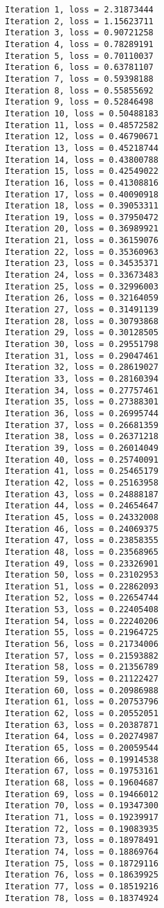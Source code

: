\documentclass[11pt]{article}
\begin{document}
    \begin{Verbatim}[commandchars=\\\{\}]
Iteration 1, loss = 2.31873444
Iteration 2, loss = 1.15623711
Iteration 3, loss = 0.90721258
Iteration 4, loss = 0.78289191
Iteration 5, loss = 0.70110037
Iteration 6, loss = 0.63781107
Iteration 7, loss = 0.59398188
Iteration 8, loss = 0.55855692
Iteration 9, loss = 0.52846498
Iteration 10, loss = 0.50488183
Iteration 11, loss = 0.48572582
Iteration 12, loss = 0.46790671
Iteration 13, loss = 0.45218744
Iteration 14, loss = 0.43800788
Iteration 15, loss = 0.42549022
Iteration 16, loss = 0.41308816
Iteration 17, loss = 0.40090918
Iteration 18, loss = 0.39053311
Iteration 19, loss = 0.37950472
Iteration 20, loss = 0.36989921
Iteration 21, loss = 0.36159076
Iteration 22, loss = 0.35360963
Iteration 23, loss = 0.34535371
Iteration 24, loss = 0.33673483
Iteration 25, loss = 0.32996003
Iteration 26, loss = 0.32164059
Iteration 27, loss = 0.31491139
Iteration 28, loss = 0.30793868
Iteration 29, loss = 0.30128505
Iteration 30, loss = 0.29551798
Iteration 31, loss = 0.29047461
Iteration 32, loss = 0.28619027
Iteration 33, loss = 0.28160394
Iteration 34, loss = 0.27757461
Iteration 35, loss = 0.27388301
Iteration 36, loss = 0.26995744
Iteration 37, loss = 0.26681359
Iteration 38, loss = 0.26371218
Iteration 39, loss = 0.26014049
Iteration 40, loss = 0.25740091
Iteration 41, loss = 0.25465179
Iteration 42, loss = 0.25163958
Iteration 43, loss = 0.24888187
Iteration 44, loss = 0.24654647
Iteration 45, loss = 0.24332008
Iteration 46, loss = 0.24069375
Iteration 47, loss = 0.23858355
Iteration 48, loss = 0.23568965
Iteration 49, loss = 0.23326901
Iteration 50, loss = 0.23102953
Iteration 51, loss = 0.22862093
Iteration 52, loss = 0.22654744
Iteration 53, loss = 0.22405408
Iteration 54, loss = 0.22240206
Iteration 55, loss = 0.21964725
Iteration 56, loss = 0.21734006
Iteration 57, loss = 0.21593882
Iteration 58, loss = 0.21356789
Iteration 59, loss = 0.21122427
Iteration 60, loss = 0.20986988
Iteration 61, loss = 0.20753796
Iteration 62, loss = 0.20552051
Iteration 63, loss = 0.20387871
Iteration 64, loss = 0.20274987
Iteration 65, loss = 0.20059544
Iteration 66, loss = 0.19914538
Iteration 67, loss = 0.19753161
Iteration 68, loss = 0.19604687
Iteration 69, loss = 0.19466012
Iteration 70, loss = 0.19347300
Iteration 71, loss = 0.19239917
Iteration 72, loss = 0.19083935
Iteration 73, loss = 0.18978491
Iteration 74, loss = 0.18869764
Iteration 75, loss = 0.18729116
Iteration 76, loss = 0.18639925
Iteration 77, loss = 0.18519216
Iteration 78, loss = 0.18374924

\end{Verbatim}
\end{document}
